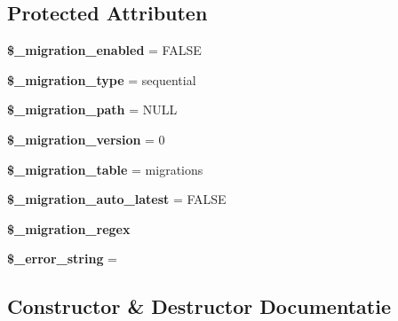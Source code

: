 \subsection*{Protected Attributen}
\begin{DoxyCompactItemize}
\item 
\mbox{\label{class_c_i___migration_a4ab2a6819f2d038b7ad2faa0a09161d1}} 
{\bfseries \$\+\_\+migration\+\_\+enabled} = F\+A\+L\+SE
\item 
\mbox{\label{class_c_i___migration_a74ff9f79bd4a13fec8a3f08bc57ead97}} 
{\bfseries \$\+\_\+migration\+\_\+type} = \textquotesingle{}sequential\textquotesingle{}
\item 
\mbox{\label{class_c_i___migration_a47cd630e42ae345f6e6ebe4235612a2e}} 
{\bfseries \$\+\_\+migration\+\_\+path} = N\+U\+LL
\item 
\mbox{\label{class_c_i___migration_a6bffbb1001557bd7ffb22183b51f589d}} 
{\bfseries \$\+\_\+migration\+\_\+version} = 0
\item 
\mbox{\label{class_c_i___migration_aba6d942d699615d04319339a0d6afac1}} 
{\bfseries \$\+\_\+migration\+\_\+table} = \textquotesingle{}migrations\textquotesingle{}
\item 
\mbox{\label{class_c_i___migration_aabf374ca6bf453ebd07070a5c0dfc16f}} 
{\bfseries \$\+\_\+migration\+\_\+auto\+\_\+latest} = F\+A\+L\+SE
\item 
\mbox{\label{class_c_i___migration_a0010078622b62542cdef48fe64fc519f}} 
{\bfseries \$\+\_\+migration\+\_\+regex}
\item 
\mbox{\label{class_c_i___migration_a2574ed23c2ed6d71d6e8396f0c4fde0f}} 
{\bfseries \$\+\_\+error\+\_\+string} = \textquotesingle{}\textquotesingle{}
\end{DoxyCompactItemize}


\subsection{Constructor \& Destructor Documentatie}
\mbox{\label{class_c_i___migration_af7f9493844d2d66e924e3c1df51ce616}} 
